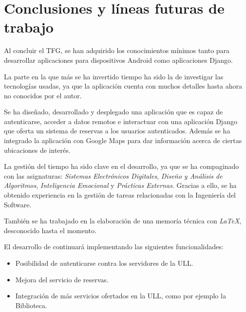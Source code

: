 %
%
%
%
\chapter{Conclusiones y líneas futuras de trabajo} \label{chap:to-do} 

Al concluir el TFG, se han adquirido los conocimientos mínimos tanto para desarrollar aplicaciones para dispositivos Android como aplicaciones Django.

La parte en la que más se ha invertido tiempo ha sido la de investigar las tecnologías usadas, ya que la aplicación cuenta con muchos detalles hasta ahora no conocidos por el autor.

Se ha diseñado, desarrollado y desplegado una aplicación que es capaz de autenticarse, acceder a datos remotos e interactuar con una aplicación Django que oferta un sistema de reservas a los usuarios autenticados. Además se ha integrado la aplicación con Google Maps para dar información acerca de ciertas ubicaciones de interés.

La gestión del tiempo ha sido clave en el desarrollo, ya que se ha compaginado con las asignaturas: \textit{Sistemas Electrónicos Digitales}, \textit{Diseño y Análisis de Algoritmos}, \textit{Inteligencia Emocional} y \textit{Prácticas Externas}. Gracias a ello, se ha obtenido experiencia en la gestión de tareas relacionadas con la Ingeniería del 
Software. 

También se ha trabajado en la elaboración de una memoría técnica con \textit{LaTeX}, desconocido hasta el momento. 

El desarrollo de \App continuará implementando las siguientes funcionalidades:

\begin{itemize}
\item Posibilidad de autenticarse contra los servidores de la ULL.
\item Mejora del servicio de reservas.
\item Integración de más servicios ofertados en la ULL, como por ejemplo la Biblioteca.
\end{itemize}


